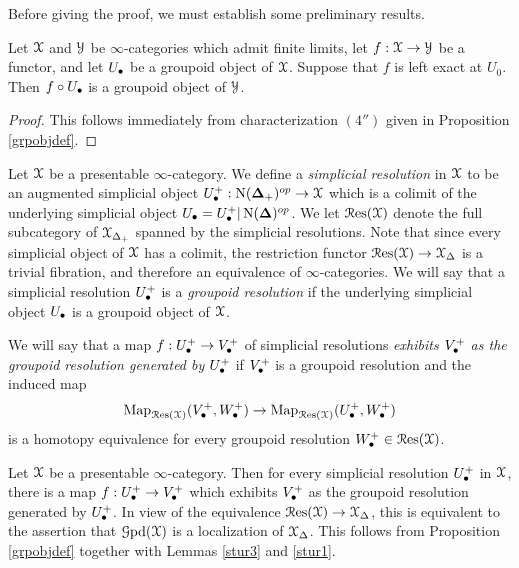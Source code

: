 Before giving the proof, we must establish some preliminary results.

\begin{lemma}\label{drumb}
Let $\operatorname{\mathcal{X}}$ and $\operatorname{\mathcal{Y}}$ be $\infty$-categories which admit finite limits, let
$f: \operatorname{\mathcal{X}} \rightarrow \operatorname{\mathcal{Y}}$ be a functor, and let $U_{\bullet}$ be a groupoid object
of $\operatorname{\mathcal{X}}$. Suppose that $f$ is left exact at $U_0$. Then $f \circ U_{\bullet}$ is a groupoid
object of $\operatorname{\mathcal{Y}}$. 
\end{lemma}

\begin{proof}
This follows immediately from characterization $(4'')$ given in Proposition \ref{grpobjdef}.
\end{proof}

Let $\operatorname{\mathcal{X}}$ be a presentable $\infty$-category. We define a {\it simplicial resolution} in $\operatorname{\mathcal{X}}$ to be an augmented simplicial object $U_{\bullet}^{+} : \operatorname{N}(\operatorname{{\bf \Delta}}_{+})^{op} \rightarrow \operatorname{\mathcal{X}}$
which is a colimit of the underlying simplicial object $U_{\bullet} = U_{\bullet}^{+} | \operatorname{N}(\operatorname{{\bf \Delta}})^{op}$. We let $\operatorname{\mathcal{R}es}(\operatorname{\mathcal{X}})$ denote the full subcategory of $\operatorname{\mathcal{X}}_{\Delta_{+}}$ spanned by the simplicial resolutions. Note that since every simplicial object of $\operatorname{\mathcal{X}}$ has a colimit, 
the restriction functor $\operatorname{\mathcal{R}es}(\operatorname{\mathcal{X}}) \rightarrow \operatorname{\mathcal{X}}_{\Delta}$ is a trivial fibration, and therefore an equivalence of $\infty$-categories. We will say that a simplicial resolution $U_{\bullet}^{+}$
is a {\it groupoid resolution} if the underlying simplicial object
$U_{\bullet}$ is a groupoid object of $\operatorname{\mathcal{X}}$.

We will say that a map $f: U_{\bullet}^{+} \rightarrow V_{\bullet}^{+}$ of simplicial resolutions {\it exhibits $V_{\bullet}^{+}$ as the groupoid resolution generated by $U_{\bullet}^{+}$} if $V_{\bullet}^{+}$ is a groupoid resolution and the induced map $$ \operatorname{{Map}}_{\operatorname{\mathcal{R}es}(\operatorname{\mathcal{X}})}( V_{\bullet}^{+}, W_{\bullet}^{+} )
\rightarrow \operatorname{{Map}}_{\operatorname{\mathcal{R}es}(\operatorname{\mathcal{X}})}( U_{\bullet}^{+}, W_{\bullet}^{+} )$$
is a homotopy equivalence for every groupoid resolution $W_{\bullet}^{+} \in \operatorname{\mathcal{R}es}(\operatorname{\mathcal{X}})$.

\begin{remark}\label{swather}
Let $\operatorname{\mathcal{X}}$ be a presentable $\infty$-category. Then for every simplicial resolution
$U_{\bullet}^{+}$ in $\operatorname{\mathcal{X}}$, there is a map $f: U_{\bullet}^{+} \rightarrow V_{\bullet}^{+}$ which exhibits $V_{\bullet}^{+}$ as the groupoid resolution generated by $U_{\bullet}^{+}$. In view of
the equivalence $\operatorname{\mathcal{R}es}(\operatorname{\mathcal{X}}) \rightarrow \operatorname{\mathcal{X}}_{\Delta}$, this is equivalent to the assertion that
$\operatorname{\mathcal{G}pd}(\operatorname{\mathcal{X}})$ is a localization of $\operatorname{\mathcal{X}}_{\Delta}$. This follows from Proposition \ref{grpobjdef} together with Lemmas \ref{stur3} and \ref{stur1}.
\end{remark}

